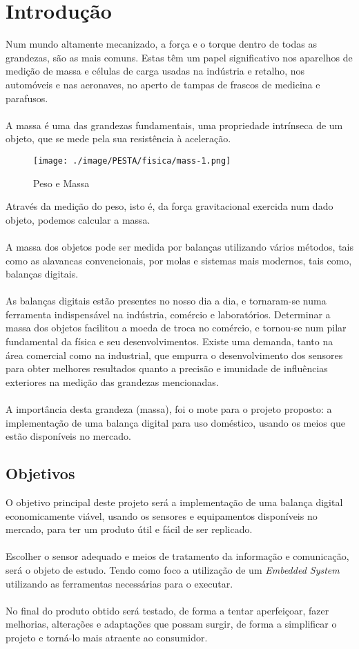 \chapter{Introdução}
Num mundo altamente mecanizado, a força e o torque dentro de todas as grandezas, são as mais comuns. Estas têm um papel significativo nos aparelhos de medição de massa e células de carga usadas na indústria e retalho, nos automóveis e nas aeronaves, no aperto de tampas de frascos de medicina e parafusos.\cite{book-9}
\\
\\
A massa é uma das grandezas fundamentais, uma propriedade intrínseca de um objeto, que se mede pela sua resistência à aceleração.\cite{book-2}
\begin{figure}[H]
	\centering
	\texttt{[image: ./image/PESTA/fisica/mass-1.png]}
	\caption{Peso e Massa}
	\label{mass}
\end{figure}
Através da medição do peso, isto é, da força gravitacional exercida num dado objeto, podemos calcular a massa. \cite{book-2}
\\
\\
A massa dos objetos pode ser medida por balanças utilizando vários métodos, tais como as alavancas convencionais, por  molas e sistemas mais modernos, tais como, balanças digitais.
\\
\\
As balanças digitais estão presentes no nosso dia a dia, e tornaram-se numa ferramenta indispensável na indústria, comércio e laboratórios. Determinar a massa dos objetos facilitou a moeda de troca no comércio, e tornou-se num pilar fundamental da física e seu desenvolvimentos. Existe uma demanda, tanto na área comercial como na industrial, que empurra o desenvolvimento dos sensores para obter melhores resultados quanto a precisão e imunidade de influências exteriores na medição das grandezas mencionadas.
\\
\\
A importância desta grandeza (massa), foi o mote para o projeto proposto: a implementação de uma balança digital para uso doméstico, usando os meios que estão disponíveis no mercado.
\section{Objetivos}
O objetivo principal deste projeto será a implementação de uma balança digital economicamente viável, usando os sensores e equipamentos disponíveis no mercado, para ter um produto útil e fácil de ser replicado.
\\
\\
Escolher o sensor adequado e meios de tratamento da informação e comunicação, será o objeto de estudo. Tendo como foco a utilização de um \textit{Embedded System} utilizando as ferramentas necessárias para o executar.
\\
\\
No final do produto obtido será testado, de forma a tentar aperfeiçoar, fazer melhorias, alterações e adaptações que possam surgir, de forma a simplificar o projeto e torná-lo mais atraente ao consumidor.
